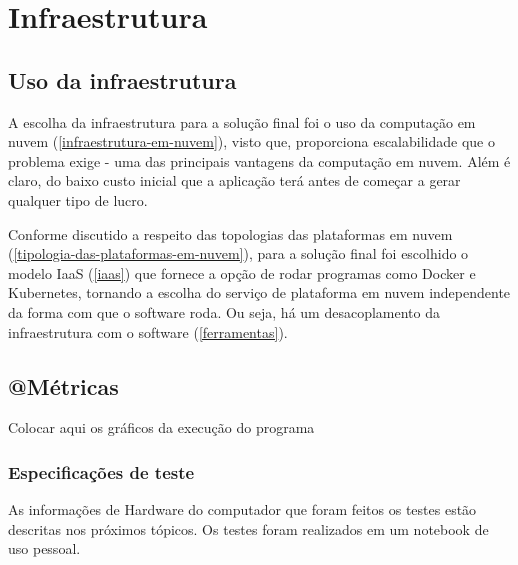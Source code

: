 \chapter{Infraestrutura}

\section{Uso da infraestrutura}

A escolha da infraestrutura para a solução final foi o uso da
computação em nuvem (\autoref{infraestrutura-em-nuvem}), visto que, proporciona
escalabilidade que o problema exige - uma das principais vantagens da computação em nuvem.
Além é claro, do baixo custo inicial que a aplicação terá antes de começar a gerar qualquer
tipo de lucro.

Conforme discutido a respeito das topologias das plataformas em
nuvem (\autoref{tipologia-das-plataformas-em-nuvem}), para a solução final foi escolhido o
modelo IaaS (\autoref{iaas}) que fornece a opção de rodar programas como Docker e
Kubernetes, tornando a escolha do serviço de plataforma em nuvem independente da forma
com que o software roda. Ou seja, há um desacoplamento da infraestrutura com o software
(\autoref{ferramentas}).

\section{@Métricas}

Colocar aqui os gráficos da execução do programa

\subsection{Especificações de teste}

As informações de Hardware
do computador que foram feitos os testes estão descritas nos próximos tópicos.
Os testes foram realizados em um notebook de uso pessoal.


